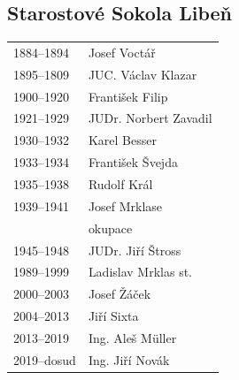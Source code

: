\documentclass[a5paper, 11pt, twoside]{article}
\begin{document}
\subsection*{Starostové Sokola Libeň }
\setlength{\parindent}{0pt}

\begin{tabular}[]{l l}
1884--1894 & Josef Voctář \\
1895--1809 & JUC. Václav Klazar \\
1900--1920 & František Filip \\
1921--1929 & JUDr. Norbert Zavadil \\
1930--1932 & Karel Besser \\
1933--1934 & František Švejda \\
1935--1938 & Rudolf Král \\
1939--1941 & Josef Mrklase\\[6pt]
& okupace \\[6pt]
1945--1948 & JUDr. Jiří Štross \\
1989--1999 & Ladislav Mrklas st. \\
2000--2003 & Josef Žáček \\
2004--2013 & Jiří Sixta \\
2013--2019 & Ing. Aleš Müller \\
2019--dosud & Ing. Jiří Novák \\
\end{tabular}
\end{document}
